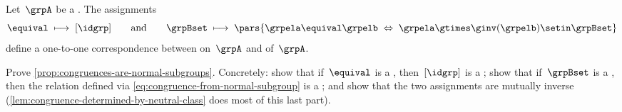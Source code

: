 \begin{proposition}
    \label{prop:congruences-are-normal-subgroups}
    Let~$\grpA$ be a .
    The assignments
    \begin{equation}
        \equival \; \longmapsto \; [\idgrp]
        \qquad \text{and} \qquad
        \grpBset \; \longmapsto \; \pars{ \grpela \equival \grpelb \; \Leftrightarrow \; \grpela \gtimes \ginv(\grpelb) \setin \grpBset }
    \end{equation}
    define a one-to-one correspondence between  on~$\grpA$ and  of~$\grpA$.
\end{proposition}

\begin{exercise}
    \label{ex:congruence-normal-correspondence}
    Prove \cref{prop:congruences-are-normal-subgroups}.
    Concretely: show that if~$\equival$ is a , then~$[\idgrp]$ is a ; show that if~$\grpBset$ is a , then the relation defined via \cref{eq:congruence-from-normal-subgroup} is a ; and show that the two assignments are mutually inverse (\cref{lem:congruence-determined-by-neutral-class} does most of this last part).
\end{exercise}
